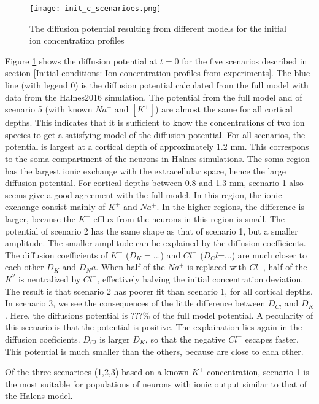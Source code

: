 \documentclass{article}
\begin{document}
\begin{figure}
  \texttt{[image: init\_c\_scenarioes.png]}
  \caption{The diffusion potential resulting from different models for the initial ion concentration profiles}
  \label{fig:init_c_scenarioes}
\end{figure}

Figure \ref{fig:init_c_scenarioes} shows the diffusion potential at $t=0$ for the five scenarios described in section \ref{Initial conditions: Ion concentration profiles from experiments}. The blue line (with legend 0) is the diffusion potential calculated from the full model with data from the Halnes2016 simulation. The potential from the full model and of scenario 5 (with known $Na^+$ and $[K^+]$) are almost the same for all cortical depths. This indicates that it is sufficient to know the concentrations of two ion species to get a satisfying model of the diffusion potential. For all scenarios, the potential is largest at a cortical depth of approximately 1.2 mm. This correspons to the soma compartment of the neurons in Halnes simulations. The soma region has the largest ionic exchange with the extracellular space, hence the large diffusion potential. For cortical depths between 0.8 and 1.3 mm, scenario 1 also seems give a good agreement with the full model. In this region, the ionic exchange consist mainly of $K^+$ and $Na^+$. In the higher regions, the difference is larger, because the $K^+$ efflux from the neurons in this region is small. The potential of scenario 2 has the same shape as that of scenario 1, but a smaller amplitude. The smaller amplitude can be explained by the diffusion coefficients. The diffusion coefficients of $K^+$ ($D_K = ...$) and $Cl^-$ ($D_Cl$=...) are much closer to each other $D_K$ and $D_Na$. When half of the $Na^+ $ is replaced with $Cl^-$, half of the $K^?$ is neutralized by $Cl^-$, effectively halving the initial concentration deviation. The result is that scenario 2 has poorer fit than scenario 1, for all cortical depths. In scenario 3, we see the consequences of the little difference between $D_{Cl}$ and $D_K$. Here, the diffusions potential is ???\% of the full model potential. A pecularity of this scenario is that the potential is positive. The explaination lies again in the diffusion coeficients. $D_{Cl}$ is larger $D_K$, so that the negative $Cl^-$ escapes faster. This potential is much smaller than the others, because  are close to each other.

Of the three scenarioes (1,2,3) based on a known $K^+$ concentration, scenario 1 is the most suitable for populations of neurons with ionic output similar to that of the Halens model.
\end{document}
